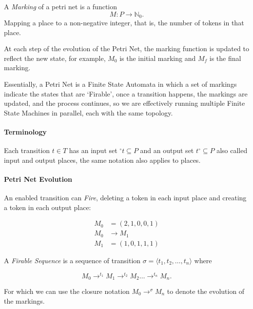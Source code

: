 \documentclass[openright, twoside, twocolumn]{report}
\begin{document}
    \begin{definition}[Marking]
      \label{def:marking}
      A \emph{Marking} of a petri net is a function
      \[
        M: P \to \mathbb{N}_0
      .\]
      Mapping a place to a non-negative integer, that is, the number of tokens in that place.

      At each step of the evolution of the Petri Net, the marking function is updated to reflect the new state, for example, $ M_0$ is the initial marking and $ M_f$ is the final marking.
    \end{definition}

    Essentially, a Petri Net is a Finite State Automata in which a set of markings indicate the states that are `Firable', once a transition
    happens, the markings are updated, and the process continues, so we are effectively running multiple Finite State Machines
    in parallel, each with the same topology.

    \paragraph{Terminology}

    Each transition $t \in  T$  has an input set ${}^{\circ}t \subseteq P$ and an output set $t^{\circ} \subseteq  P$ also called input
    and output places, the same notation also applies to places.

    \paragraph{Petri Net Evolution}

    An enabled transition can \emph{Fire}, deleting a token in each input place and creating a token in each output place:

    \begin{align*}
      M_0 &= \left( 2, 1, 0, 0, 1 \right)\\
      M_0 &\to M_1\\
      M_1 &= \left( 1, 0, 1, 1, 1 \right)
    \end{align*}

    A \emph{Firable Sequence} is a sequence of transition $\sigma = \langle t_1, t_2, \ldots, t_n \rangle$ where

    \[
      M_0 \to^{ t_1} M_1 \to^{ t_2} M_2 \ldots \to^{ t_n} M_n
    .\]

    For which we can use the closure notation $ M_0 \to^{\sigma} M_n$ to denote the evolution of the markings.
\end{document}
